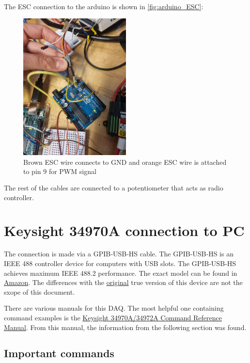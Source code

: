 \documentclass[a4paper]{article}
\begin{document}
{The ESC connection to the arduino is shown in \autoref{fig:arduino_ESC}:

\begin{figure}[h!]
	\centering
	\includegraphics[width=0.5\textwidth]{arduino_ESC.jpeg}
	\caption{Brown ESC wire connects to GND and orange ESC wire is attached to pin 9 for PWM signal}
	\label{fig:arduino_ESC}
\end{figure}

The rest of the cables are connected to a potentiometer that acts as radio controller.

\section{Keysight 34970A connection to PC}
The connection is made via a GPIB‑USB‑HS cable. The GPIB‑USB‑HS is an IEEE 488 controller device for computers with USB slots. The GPIB‑USB‑HS achieves maximum IEEE 488.2 performance. The exact model can be found in \hyperref{https://www.amazon.com/Kanonaki-GPIB-USB-HS-Interface-Adapter-Controller/dp/B07Q84XJJF}{category}{name}{Amazon}. The differences with the \hyperref{https://www.newark.com/ni/780570-01/gpib-usb-hs-gpib-control-device/dp/14AJ5119}{category}{name}{original} true version of this device are not the sxope of this document. 

There are various manuals for this DAQ. The most helpful one containing command examples is the \href{https://documentation.help/Keysight-34970A-34972A/documentation.pdf}{Keysight 34970A/34972A Command Reference Manual}. From this manual, the information from the following section was found.

\subsection{Important commands}

}
\end{document}

